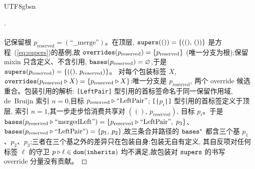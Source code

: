 \begin{CJK*}{UTF8}{gbsn}
\begin{proof}[]
  \paragraph{}
  记保留根 $p_{\mathrm{reserved}} = (\text{``\_\_merge''})$。在顶层,
  $\mathtt{supers}(()) = \{((),\, ())\}$ 是方程~(\ref{eq:supers})的基例,故
  $\mathtt{overrides}(p_{\mathrm{reserved}}) = \{p_{\mathrm{reserved}}\}$
  (唯一分支为根);保留 mixin 只含定义、不含引用,
  $\mathtt{bases}(p_{\mathrm{reserved}}) = \varnothing$,于是
  $\mathtt{supers}(p_{\mathrm{reserved}}) = \{((),\, p_{\mathrm{reserved}})\}$。
  对每个包装标签 $X$,
  $\mathtt{overrides}(p_{\mathrm{reserved}} \mathbin{\triangleright} X) =
  \{p_{\mathrm{reserved}} \mathbin{\triangleright} X\}$:唯一分支是 $p_{\mathrm{reserved}}$,
  两个 override 候选重合。包装引用的解析:
  \texttt{[LeftPair]} 型引用的首标签命名于同一保留作用域,
  de~Bruijn 索引 $n = 0$,目标
  $p_{\mathrm{reserved}} \mathbin{\triangleright} \text{``LeftPair''}$;
  \texttt{[|$p_i$|]} 型引用的首标签定义于顶层,
  索引 $n = 1$,其一步走步恰消费共享对 $((),\, p_{\mathrm{reserved}})$,
  目标 $p_i$。于是
  $\mathtt{bases}(p_{\mathrm{reserved}} \mathbin{\triangleright} \text{``mergedLeft''}) =
  \{p_{\mathrm{reserved}} \mathbin{\triangleright} \text{``LeftPair''},\; p_3\}$、
  $\mathtt{bases}(p_{\mathrm{reserved}} \mathbin{\triangleright} \text{``LeftPair''}) =
  \{p_1,\, p_2\}$,故三条合并路径的 $\mathtt{bases}^*$ 都含三个基
  $p_1$、$p_2$、$p_3$;三者在三个基之外的差异只在包装自身:包装无自有定义,
  其自反项对任何标签 $\ell$ 的守卫 $p \mathbin{\triangleright} \ell \in \mathtt{dom}(\mathtt{inherits})$
  均不满足,故包装对 $\mathtt{supers}$ 的书写 override 分量没有贡献。


\end{proof}
\end{CJK*}
